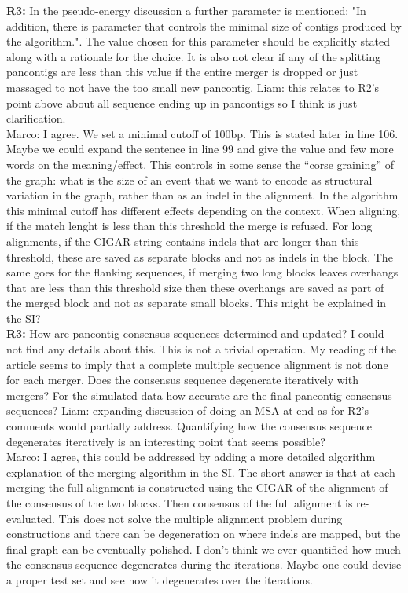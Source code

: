 \documentclass[aps,rmp,onecolumn]{revtex4-1}
\newcommand{\Marco}[1]{{\color{gray}Marco: #1}}
\newcommand{\Liam}[1]{{\color{teal}Liam: #1}}
\newcommand{\reviewer}[2]{\textbf{#1:} #2\vskip 5mm}
\begin{document}
\reviewer{R3}{In the pseudo-energy discussion a further parameter is mentioned: "In addition, there is parameter that controls the minimal size of contigs produced by the algorithm.". The value chosen for this parameter should be explicitly stated along with a rationale for the choice. It is also not clear if any of the splitting pancontigs are less than this value if the entire merger is dropped or just massaged to not have the too small new pancontig.}
\Liam{this relates to R2's point above about all sequence ending up in pancontigs so I think is just clarification.}\\
\Marco{I agree. We set a minimal cutoff of 100bp. This is stated later in line 106. Maybe we could expand the sentence in line 99 and give the value and few more words on the meaning/effect. This controls in some sense the ``corse graining'' of the graph: what is the size of an event that we want to encode as structural variation in the graph, rather than as an indel in the alignment. In the algorithm this minimal cutoff has different effects depending on the context. When aligning, if the match lenght is less than this threshold the merge is refused. For long alignments, if the CIGAR string contains indels that are longer than this threshold, these are saved as separate blocks and not as indels in the block. The same goes for the flanking sequences, if merging two long blocks leaves overhangs that are less than this threshold size then these overhangs are saved as part of the merged block and not as separate small blocks. This might be explained in the SI?}\\

\reviewer{R3}{How are pancontig consensus sequences determined and updated? I could not find any details about this. This is not a trivial operation. My reading of the article seems to imply that a complete multiple sequence alignment is not done for each merger. Does the consensus sequence degenerate iteratively with mergers? For the simulated data how accurate are the final pancontig consensus sequences?}
\Liam{expanding discussion of doing an MSA at end as for R2's comments would partially address. Quantifying how the consensus sequence degenerates iteratively is an interesting point that seems possible?}\\
\Marco{I agree, this could be addressed by adding a more detailed algorithm explanation of the merging algorithm in the SI. The short answer is that at each merging the full alignment is constructed using the CIGAR of the alignment of the consensus of the two blocks. Then consensus of the full alignment is re-evaluated. This does not solve the multiple alignment problem during constructions and there can be degeneration on where indels are mapped, but the final graph can be eventually polished. I don't think we ever quantified how much the consensus sequence degenerates during the iterations. Maybe one could devise a proper test set and see how it degenerates over the iterations.}
\end{document}
